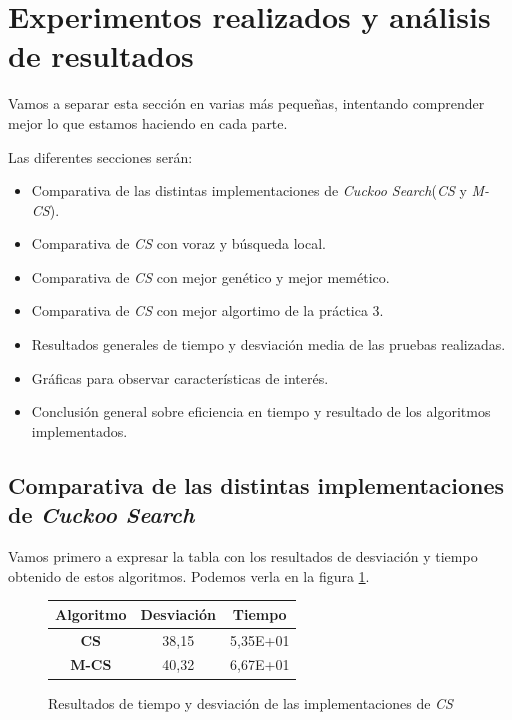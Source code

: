\newpage

\section{Experimentos realizados y análisis de resultados}


Vamos a separar esta sección en varias más pequeñas, intentando comprender mejor lo que estamos haciendo en cada parte.

Las diferentes secciones serán:

\begin{itemize}
\item Comparativa de las distintas implementaciones de \textit{Cuckoo Search}(\textit{CS} y \textit{M-CS}).
\item Comparativa de \textit{CS} con voraz y búsqueda local.
\item Comparativa de \textit{CS} con mejor genético y mejor memético.
\item Comparativa de \textit{CS} con mejor algortimo de la práctica 3.
\item Resultados generales de tiempo y desviación media de las pruebas realizadas.
\item Gráficas para observar características de interés.
\item Conclusión general sobre eficiencia en tiempo y resultado de los algoritmos implementados.
\end{itemize}


\subsection{Comparativa de las distintas implementaciones de \textit{Cuckoo Search}}

Vamos primero a expresar la tabla con los resultados de desviación y tiempo obtenido de estos algoritmos. Podemos verla en la figura \ref{tab:compCSs}.

\begin{figure}[H]
    \centering
    \begin{tabular}{|c|c|c|}
        \hline
        Algoritmo & \textbf{Desviación} & \textbf{Tiempo}\\
        \hline
        \textbf{CS} & 38,15 & 5,35E+01\\
        \hline
        \textbf{M-CS} & 40,32 & 6,67E+01\\
        \hline
    \end{tabular}
    \caption{Resultados de tiempo y desviación de las implementaciones de \textit{CS}}
    \label{tab:compCSs}
\end{figure}

